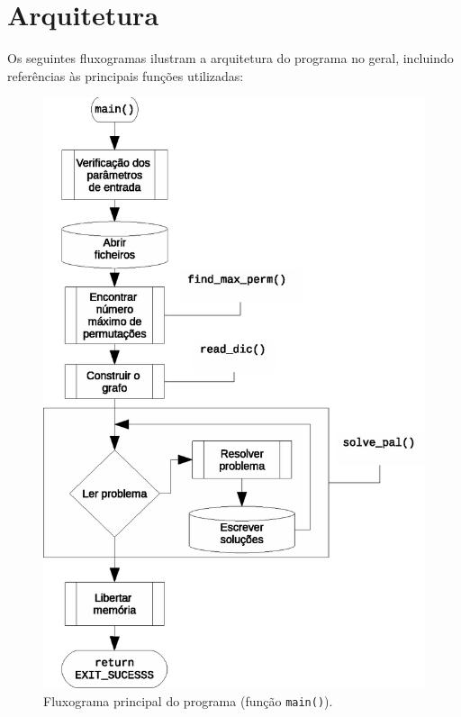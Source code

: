\documentclass[a4paper, 18pt]{article}
\begin{document}
\section{Arquitetura}
	\par
	Os seguintes fluxogramas ilustram a arquitetura do programa no geral, incluindo referências às principais funções utilizadas:
	\begin{figure}[H]
		\centering
		\includegraphics[width=0.69\linewidth]{main}
		\caption{Fluxograma principal do programa (função \texttt{main()}).}
	\end{figure}
\end{document}
